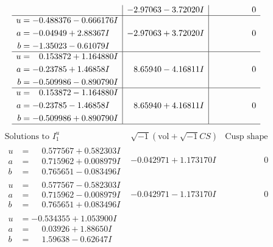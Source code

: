 \documentclass[1p]{elsarticle_modified}
\theoremstyle{definition}
\newcommand{\I}{\sqrt{-1}}
\begin{document}
$$\begin{array}{c|c|c}
 & -2.97063 - 3.72020 I & \phantom{-0.000000 } 0 \\ \hline\begin{aligned}
u &= -0.488376 - 0.666176 I \\
a &= -0.04949 + 2.88367 I \\
b &= -1.35023 - 0.61079 I\end{aligned}
 & -2.97063 + 3.72020 I & \phantom{-0.000000 } 0 \\ \hline\begin{aligned}
u &= \phantom{-}0.153872 + 1.164880 I \\
a &= -0.23785 + 1.46858 I \\
b &= -0.509986 - 0.890790 I\end{aligned}
 & \phantom{-}8.65940 - 4.16811 I & \phantom{-0.000000 } 0 \\ \hline\begin{aligned}
u &= \phantom{-}0.153872 - 1.164880 I \\
a &= -0.23785 - 1.46858 I \\
b &= -0.509986 + 0.890790 I\end{aligned}
 & \phantom{-}8.65940 + 4.16811 I & \phantom{-0.000000 } 0\\
 \hline 
 \end{array}$$\newpage$$\begin{array}{c|c|c}  
\text{Solutions to }I^u_{1}& \I (\text{vol} + \sqrt{-1}CS) & \text{Cusp shape}\\
 \hline 
\begin{aligned}
u &= \phantom{-}0.577567 + 0.582303 I \\
a &= \phantom{-}0.715962 + 0.008979 I \\
b &= \phantom{-}0.765651 - 0.083496 I\end{aligned}
 & -0.042971 + 1.173170 I & \phantom{-0.000000 } 0 \\ \hline\begin{aligned}
u &= \phantom{-}0.577567 - 0.582303 I \\
a &= \phantom{-}0.715962 - 0.008979 I \\
b &= \phantom{-}0.765651 + 0.083496 I\end{aligned}
 & -0.042971 - 1.173170 I & \phantom{-0.000000 } 0 \\ \hline\begin{aligned}
u &= -0.534355 + 1.053900 I \\
a &= \phantom{-}0.03926 + 1.88650 I \\
b &= \phantom{-}1.59638 - 0.62647 I\end{aligned}

\end{array}$$
\end{document}
